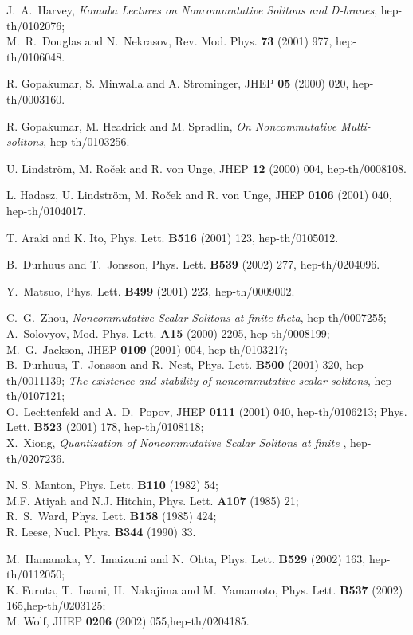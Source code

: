 \documentclass[a4paper,12pt]{article}
\begin{document}
\begin{thebibliography}{99}
J.~A.~Harvey, {\it Komaba Lectures on Noncommutative Solitons and
 D-branes},
hep-th/0102076;\\
M.~R.~Douglas and N.~Nekrasov, Rev. Mod. Phys. {\bf 73} (2001) 977,
hep-th/0106048.


 R. Gopakumar, S. Minwalla and A. Strominger,
 JHEP {\bf 05} (2000) 020, hep-th/0003160.


 R. Gopakumar, M. Headrick and M. Spradlin,
 {\it On Noncommutative Multi-solitons},
 hep-th/0103256.

 U. Lindstr\"om, M. Ro\v{c}ek and R. von Unge,
 JHEP {\bf 12} (2000) 004, hep-th/0008108.

L. Hadasz, U. Lindstr\"om, M. Ro\v{c}ek and R. von Unge,
JHEP {\bf 0106} (2001) 040, hep-th/0104017.

T. Araki and K. Ito, Phys. Lett. {\bf B516} (2001) 123, hep-th/0105012.

B.~Durhuus and T.~Jonsson, Phys. Lett. {\bf B539} (2002) 277,
hep-th/0204096.

Y.~Matsuo, Phys. Lett. {\bf B499} (2001) 223, hep-th/0009002.

C.~G.~Zhou, {\it Noncommutative Scalar Solitons at finite theta},
hep-th/0007255;\\
A.~Solovyov, Mod. Phys. Lett. {\bf A15} (2000) 2205, hep-th/0008199;\\
M.~G.~Jackson, JHEP {\bf 0109} (2001) 004, hep-th/0103217;\\
B.~Durhuus, T.~Jonsson and R.~Nest, Phys. Lett. {\bf B500} (2001) 320,
 hep-th/0011139; {\it The existence and stability of
 noncommutative scalar solitons}, hep-th/0107121;\\
O.~Lechtenfeld and A.~D.~Popov, JHEP {\bf 0111} (2001) 040,
 hep-th/0106213;
Phys. Lett. {\bf B523} (2001) 178, hep-th/0108118;\\
X.~Xiong, {\it Quantization of Noncommutative Scalar Solitons at finite
\myHighlight{$\theta$}\coordHE{}}, hep-th/0207236.



 N. S. Manton,
 Phys. Lett. {\bf B110} (1982) 54;  \\
 M.F. Atiyah and N.J. Hitchin, Phys. Lett. {\bf A107} (1985) 21;\\
 R.~S.~Ward, Phys. Lett. {\bf B158} (1985) 424;\\
 R. Leese,
 Nucl. Phys. {\bf B344} (1990) 33.

M.~Hamanaka, Y.~Imaizumi and N.~Ohta, Phys. Lett. {\bf B529} (2002) 163,
hep-th/0112050;\\
K. Furuta, T.~Inami, H.~Nakajima and M.~Yamamoto, Phys. Lett. {\bf B537}
(2002) 165,hep-th/0203125;\\
M. Wolf, JHEP {\bf 0206} (2002) 055,hep-th/0204185.


\end{thebibliography}
\end{document}
